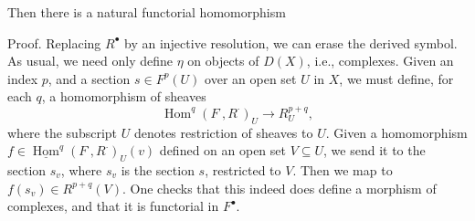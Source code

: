 \documentclass[12pt]{book}
\DeclareMathOperator{\Hom}{Hom}
\begin{document}
Then there is a natural functorial homomorphism

\setcounter{page}{256}
Proof. Replacing \(R^{\bullet}\) by an injective resolution, we can erase the derived symbol. As usual, we need only define \(\eta\) on objects of \(D(X)\), i.e., complexes. Given an index \(p\), and a section \(s \in F^{p}(U)\) over an open set \(U\) in \(X\), we must define, for each \(q\), a homomorphism of sheaves
\[
\Hom^{q}\left(F^{\cdot}, R^{\cdot}\right)_{U} \to R_{U}^{p+q} ,
\]
where the subscript \(U\) denotes restriction of sheaves to \(U\). Given a homomorphism \(f \in \underline{\Hom}^{q}(F^{\cdot},R^{\cdot})_{U}(v)\) defined on an open set \(V \subseteq U\), we send it to the section \(s_{v}\), where \(s_{v}\) is the section \(s\), restricted to \(V\). Then we map to \(f(s_{v}) \in R^{p+q}(V)\). One checks that this indeed does define a morphism of complexes, and that it is functorial in \(F^{\bullet}\).
\end{document}
